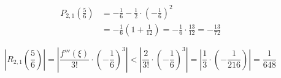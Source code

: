 \documentclass[a4paper,12pt]{article}
\begin{document}
\begin{enumerate}[label=\alph*)]
\begin{align*}
  P_{2,1}\!\left(\frac{5}{6}\right)
  &= -\frac{1}{6} - \frac{1}{2} \cdot \left(-\frac{1}{6}\right)^{2} \\[4pt]
  &= -\frac{1}{6}\left(1 + \frac{1}{12}\right)
   = -\frac{1}{6} \cdot \frac{13}{12}
   = -\frac{13}{72}
\end{align*}

\[
  \left\lvert R_{2,1}\!\left(\frac{5}{6}\right) \right\rvert
  = \left\lvert \frac{f'''(\xi)}{3!} \cdot \left(-\frac{1}{6}\right)^{3} \right\rvert
  < \left\lvert \frac{2}{3!} \cdot \left(-\frac{1}{6}\right)^{3} \right\rvert
  = \left\lvert \frac{1}{3} \cdot \left(-\frac{1}{216}\right) \right\rvert
  = \frac{1}{648}
\]

\end{enumerate}
\end{document}

